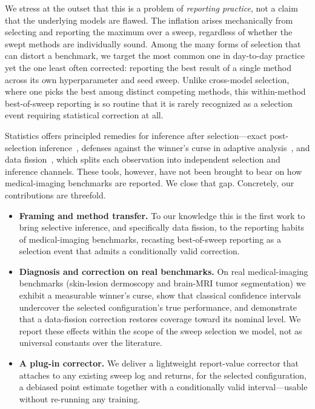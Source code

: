 \documentclass[conference]{IEEEtran}
\begin{document}
We stress at the outset that this is a problem of \emph{reporting practice}, not
a claim that the underlying models are flawed. The inflation arises mechanically
from selecting and reporting the maximum over a sweep, regardless of whether the
swept methods are individually sound. Among the many forms of selection that can
distort a benchmark, we target the most common one in day-to-day practice yet
the one least often corrected: reporting the best result of a single method
across its own hyperparameter and seed sweep. Unlike cross-model selection,
where one picks the best among distinct competing methods, this within-method
best-of-sweep reporting is so routine that it is rarely recognized as a
selection event requiring statistical correction at all.

Statistics offers principled remedies for inference after selection---exact
post-selection inference~\cite{lee2016exact}, defenses against the winner's curse
in adaptive analysis~\cite{zrnic2024flexible}, and data
fission~\cite{leiner2023datafission}, which splits each observation into
independent selection and inference channels. These tools, however, have not been
brought to bear on how medical-imaging benchmarks are reported. We close that
gap. Concretely, our contributions are threefold.
\begin{itemize}
  \item \textbf{Framing and method transfer.} To our knowledge this is the first
  work to bring selective inference, and specifically data fission, to the
  reporting habits of medical-imaging benchmarks, recasting best-of-sweep
  reporting as a selection event that admits a conditionally valid correction.
  \item \textbf{Diagnosis and correction on real benchmarks.} On real
  medical-imaging benchmarks (skin-lesion dermoscopy and brain-MRI tumor
  segmentation) we exhibit a measurable winner's curse, show that classical
  confidence intervals undercover the selected configuration's true performance,
  and demonstrate that a data-fission correction restores coverage toward its
  nominal level. We report these effects within the scope of the sweep selection
  we model, not as universal constants over the literature.
  \item \textbf{A plug-in corrector.} We deliver a lightweight report-value
  corrector that attaches to any existing sweep log and returns, for the selected
  configuration, a debiased point estimate together with a conditionally valid
  interval---usable without re-running any training.
\end{itemize}
\end{document}
